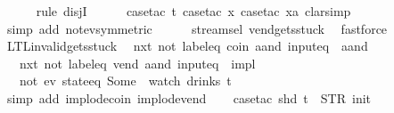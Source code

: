 \begin{isabellebody}
\ \ \ \ \isamarkupfalse%
\ {\isacharparenleft}rule\ disjI{}{\isacharparenright}\isanewline
\ \ \ \ \isamarkupfalse%
\ {\isacharparenleft}case{\isacharunderscore}tac\ t{\isacharcomma}\ case{\isacharunderscore}tac\ x{}{\isacharcomma}\ case{\isacharunderscore}tac\ x{}a{\isacharcomma}\ clarsimp{\isacharparenright}\isanewline
\ \ \ \ \isamarkupfalse%
\ {\isacharparenleft}simp\ add{\isacharcolon}\ not{\isacharunderscore}ev{\isacharbrackleft}symmetric{\isacharbrackright}{\isacharparenright}\isanewline
\ \ \ \ \isamarkupfalse%
\ stream{\isachardot}sel{\isacharparenleft}{}{\isacharparenright}\ vend{\isacharunderscore}gets{\isacharunderscore}stuck\ \isamarkupfalse%
\ fastforce\isanewline
{}\isamarkupfalse%
%
\endisatagproof
{\isafoldproof}%
%
\isadelimproof
\isanewline
%
\endisadelimproof
\isanewline
{}\isamarkupfalse%
\ LTL{\isacharunderscore}invalid{\isacharunderscore}gets{\isacharunderscore}stuck{\isacharunderscore}{}{\isacharcolon}\isanewline
\ \ {\isachardoublequoteopen}{\isacharparenleft}{\isacharparenleft}{\isacharparenleft}nxt\ {\isacharparenleft}not\ {\isacharparenleft}label{\isacharunderscore}eq\ {\isacharprime}{\isacharprime}coin{\isacharprime}{\isacharprime}\ aand\ input{\isacharunderscore}eq\ {\isacharbrackleft}{\isacharbrackright}{\isacharparenright}{\isacharparenright}{\isacharparenright}\ aand\isanewline
\ \ \ {\isacharparenleft}nxt\ {\isacharparenleft}not\ {\isacharparenleft}label{\isacharunderscore}eq\ {\isacharprime}{\isacharprime}vend{\isacharprime}{\isacharprime}\ aand\ input{\isacharunderscore}eq\ {\isacharbrackleft}{\isacharbrackright}{\isacharparenright}{\isacharparenright}{\isacharparenright}{\isacharparenright}\ impl\isanewline
\ \ \ {\isacharparenleft}not\ {\isacharparenleft}ev\ {\isacharparenleft}state{\isacharunderscore}eq\ {\isacharparenleft}Some\ {}{\isacharparenright}{\isacharparenright}{\isacharparenright}{\isacharparenright}{\isacharparenright}\ {\isacharparenleft}watch\ drinks\ t{\isacharparenright}{\isachardoublequoteclose}\isanewline
%
\isadelimproof
\ \ %
\endisadelimproof
%
\isatagproof
{}\isamarkupfalse%
\ {\isacharparenleft}simp\ add{\isacharcolon}\ implode{\isacharunderscore}coin\ implode{\isacharunderscore}vend{\isacharparenright}\isanewline
\ \ \isamarkupfalse%
\ {\isacharparenleft}case{\isacharunderscore}tac\ {\isachardoublequoteopen}shd\ t\ {\isasymnoteq}\ {\isacharparenleft}STR\ {\isacharprime}{\isacharprime}init{\isacharprime}{\isacharprime}{\isacharcomma}\ {\isacharbrackleft}{\isacharbrackright}{\isacharparenright}{\isachardoublequoteclose}{\isacharparenright}\isanewline

\end{isabellebody}
